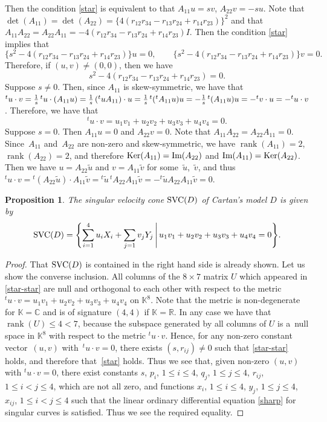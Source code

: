 \documentclass[pdftex]{sigma}
\numberwithin{equation}{section}
\newtheorem{Proposition}[Theorem]{Proposition}
 { \theoremstyle{definition}
\newtheorem{Definition}[Theorem]{Definition}
\newtheorem{Note}[Theorem]{Note}
\newtheorem{Example}[Theorem]{Example}
\newtheorem{Remark}[Theorem]{Remark} }
\theoremstyle{definition}
\newcommand{\R}{\mathbb{R}}
\newcommand{\C}{\mathbb{C}}
\newcommand{\KK}{\mathbb{K}}
\newcommand{\0}{\boldsymbol{0}}
\newcommand{\rank}{\operatorname{rank}}
\newcommand{\SVC}{{\mbox {\rm SVC}}}
\begin{document}
Then the condition \eqref{star} is equivalent to that
$A_{11}u = sv$, $A_{22}v = -su$. Note that $\det(A_{11}) = \det(A_{22}) = \{4(r_{12}r_{34} - r_{13}r_{24} + r_{14}r_{23})\}^2$
and that
$A_{11}A_{22} = A_{22}A_{11} = -4(r_{12}r_{34} - r_{13}r_{24} + r_{14}r_{23})I$. Then
the condition \eqref{star} implies that
\[
\bigl\{ s^2 - 4(r_{12}r_{34} - r_{13}r_{24} + r_{14}r_{23})\bigr\}u = 0, \qquad \bigl\{ s^2 - 4(r_{12}r_{34} - r_{13}r_{24} + r_{14}r_{23})\bigr\}v = 0.
\]
Therefore, if $(u, v) \not= (0, 0)$, then we have
\[
s^2 - 4(r_{12}r_{34} - r_{13}r_{24} + r_{14}r_{23}) = 0.
\]
Suppose $s \not= 0$. Then, since $A_{11}$ is skew-symmetric, we have that
${}^tu\cdot v = \smash{\frac{1}{s}\,{}^tu\cdot(A_{11}u)} = \smash{\frac{1}{s}\,({}^tuA_{11})\cdot u} = \smash{\frac{1}{s}\,{}^t({}^tA_{11}u)u} = - \smash{\frac{1}{s}\,{}^t(A_{11}u)u} = - {}^tv\cdot u = - {}^tu\cdot v$.
Therefore, we have that
\[
{}^tu \cdot v = u_1v_1 + u_2v_2 + u_3v_3 + u_4v_4 = 0.
\]
Suppose $s = 0$. Then $A_{11}u = 0$ and $A_{22}v = 0$. Note that $A_{11}A_{22} = A_{22}A_{11} = 0$.
Since~$A_{11}$ and~$A_{22}$ are non-zero and skew-symmetric, we have $\rank(A_{11}) = 2$, $\rank(A_{22}) = 2$, and
therefore ${\rm Ker}(A_{11}) = {\mbox{\rm Im}}(A_{22})$ and ${\mbox{\rm Im}}(A_{11}) = {\rm Ker}(A_{22})$.
Then we have $u = A_{22}\tilde{u}$ and $v = A_{11}\tilde{v}$ for some~$\tilde{u}$,~$\tilde{v}$, and thus
${}^tu\cdot v = {}^t(A_{22}\tilde{u})\cdot A_{11}\tilde{v} = {}^t\tilde{u}\,{}^t\!A_{22}A_{11}\tilde{v} = - {}^t\tilde{u}A_{22}A_{11}\tilde{v} = 0$.

\begin{Proposition}
The singular velocity cone $\SVC(D)$ of Cartan's model $D$ is given by
\[
\SVC(D) = \Biggl\{ \sum_{i=1}^4 u_iX_i + \sum_{j=1} v_jY_j \,
\Bigg\vert\, u_1v_1 + u_2v_2 + u_3v_3 + u_4v_4 = 0\Biggr\}.
\]
\end{Proposition}

\begin{proof}
That $\SVC(D)$ is contained in the right hand side is already shown. Let us show the converse inclusion.
All columns of the $8\times 7$ matrix $U$ which appeared in \eqref{star-star} are
null and orthogonal to each other with respect to the metric ${}^tu\cdot v =
u_1v_1 + u_2v_2 + u_3v_3 + u_4v_4$ on $\KK^8$. Note that the metric is non-degenerate for $\KK = \C$
and is of signature $(4, 4)$ if $\KK = \R$.
In any case we have that $\rank(U) \leq 4 < 7$, because the subspace generated by all columns of $U$
is a~null space in $\KK^8$ with respect to the metric ${}^tu\cdot v$.
Hence, for any non-zero constant vector~$(u, v)$ with~${{}^tu\cdot v = 0}$, there exists $(s, r_{ij}) \not= 0$ such that \eqref{star-star} holds, and therefore that~\eqref{star} holds. Thus we see that, given non-zero $(u, v)$ with ${}^tu\cdot v = 0$,
there exist constants $s$, $p_i$, $1 \leq i \leq 4$, $q_j$, $1 \leq j \leq 4$, $r_{ij}$, $1 \leq i < j \leq 4$, which are not all zero,
and functions $x_i$, $1 \leq i \leq 4$, $y_j$, $1 \leq j \leq 4$, $x_{ij}$, $1 \leq i < j \leq 4$
such that the linear ordinary differential equation \eqref{sharp} for singular curves is satisfied.
Thus we see the required equality.
\end{proof}
\end{document}
